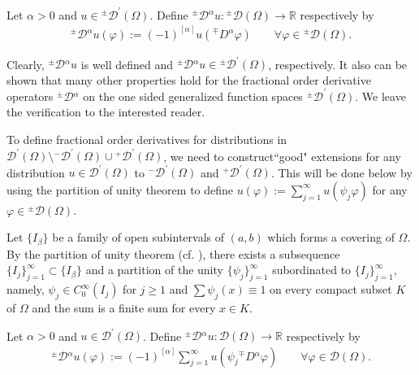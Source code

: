 \documentclass[leqno,final]{siamltex}
\numberwithin{equation}{section}
\renewcommand{\(}{\bigl(}
\renewcommand{\)}{\bigr)}
\newcommand{\R}{\mathbb{R}}
\begin{document}
 \begin{definition}
	Let $ \alpha >0$ and  $u \in {^{\pm}}{\mathscr{D}}^\prime (\Omega) $. 
	Define ${^{\pm}}{\mathcal{D}}{^{\alpha}} u: {^{\pm}}{\mathscr{D}}(\Omega) \to \R$ respectively by  
	\begin{align}\label{eq6.3}
	{^{\pm}}{\mathcal{D}}{^{\alpha}} u  (\varphi):=  
	 (-1)^{[\alpha]} u({^{\mp}}{D}{^{\alpha}} \varphi)   
	\qquad \forall \varphi \in {^{\pm}}{\mathscr{D}}(\Omega) .
	\end{align}
  
\end{definition}

Clearly, ${^{\pm}}{\mathcal{D}}{^{\alpha}} u$ is well defined and ${^{\pm}}{\mathcal{D}}{^{\alpha}} u
\in {^{\pm}}{\mathscr{D}}^\prime (\Omega) $, respectively. It also can be shown that many other properties 
hold for the fractional order derivative operators ${^{\pm}}{\mathcal{D}}{^{\alpha}}$ on the one sided 
generalized function spaces ${^{\pm}}{\mathscr{D}}^\prime (\Omega)$. We leave the verification to 
the interested reader.   

To define fractional order derivatives for distributions in ${\mathscr{D}}^\prime (\Omega)\setminus {^{-}}{\mathscr{D}}^\prime (\Omega)\cup {^{+}}{\mathscr{D}}^\prime (\Omega)$, we need to 
construct``good" extensions for any distribution $u\in {\mathscr{D}}^\prime (\Omega)$ to 
${^{-}}{\mathscr{D}}^\prime (\Omega)$ and  ${^{+}}{\mathscr{D}}^\prime (\Omega)$. 
This will be done below by using the partition of unity theorem to define 
$u (\varphi):= \sum_{j = 1}^{\infty} u( \psi_j  \varphi)$ for any $\varphi\in {^{\pm}}{\mathscr{D}}(\Omega)$.

Let $\{I_\beta\}$ be a family of open subintervals of $(a,b)$ which forms a covering of $\Omega$. 
By the  partition of unity theorem (cf. \cite{Rudin}),  there exists a subsequence $\{I_j\}_{j =1}^{\infty} \subset \{I_\beta\}$ and a partition  of the unity $\{\psi_j\}_{j = 1}^{\infty}$
subordinated to $\{I_j\}_{j= 1}^{\infty}$, namely, $\psi_j\in C^\infty_0(I_j)$ for $j\geq 1$ and $\sum \psi_j(x)\equiv 1$ 
on every compact subset $K$ of $\Omega$ and the sum is a finite sum for every $x\in K$. 


 
\begin{definition}\label{def-partition}
	Let $ \alpha >0$ and  $u \in  {\mathscr{D}}^\prime (\Omega) $. 
	Define ${^{\pm}}{\mathcal{D}}{^{\alpha}} u:  {\mathscr{D}}(\Omega) \to \R$ respectively by  
	\begin{align}\label{eq6.4}
	{^{\pm}}{\mathcal{D}}{^{\alpha}} u  (\varphi):=  
	(-1)^{[\alpha]} \sum_{j = 1}^{\infty} u( \psi_j {^{\mp}}{D}{^{\alpha}} \varphi)   
	\qquad \forall \varphi \in  {\mathscr{D}}(\Omega) .
	\end{align}
	

\end{definition} 
\end{document}
